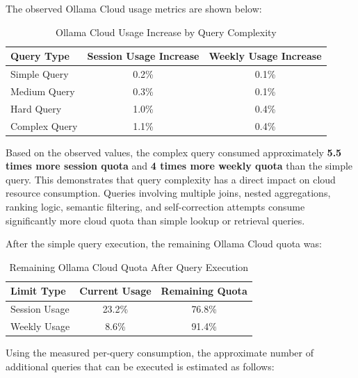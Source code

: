 \documentclass[11pt,a4paper]{article}
\begin{document}
The observed Ollama Cloud usage metrics are shown below:

\begin{table}[h]
\centering
\caption{Ollama Cloud Usage Increase by Query Complexity}
\begin{tabular}{|l|c|c|}
\hline
\textbf{Query Type} & \textbf{Session Usage Increase} & \textbf{Weekly Usage Increase} \\
\hline
Simple Query & 0.2\% & 0.1\% \\
\hline
Medium Query & 0.3\% & 0.1\% \\
\hline
Hard Query & 1.0\% & 0.4\% \\
\hline
Complex Query & 1.1\% & 0.4\% \\
\hline
\end{tabular}
\end{table}
Based on the observed values, the complex query consumed approximately \textbf{5.5 times more session quota} and \textbf{4 times more weekly quota} than the simple query. This demonstrates that query complexity has a direct impact on cloud resource consumption. Queries involving multiple joins, nested aggregations, ranking logic, semantic filtering, and self-correction attempts consume significantly more cloud quota than simple lookup or retrieval queries.

After the simple query execution, the remaining Ollama Cloud quota was:

\begin{table}[h]
\centering
\caption{Remaining Ollama Cloud Quota After Query Execution}
\begin{tabular}{|l|c|c|}
\hline
\textbf{Limit Type} & \textbf{Current Usage} & \textbf{Remaining Quota} \\
\hline
Session Usage & 23.2\% & 76.8\% \\
\hline
Weekly Usage & 8.6\% & 91.4\% \\
\hline
\end{tabular}
\end{table}

Using the measured per-query consumption, the approximate number of additional queries that can be executed is estimated as follows:

\begin{table}[h]
\centering
\caption{Approximate Query Capacity for Fresh Ollama Cloud Limits}
\end{table}
\end{document}
